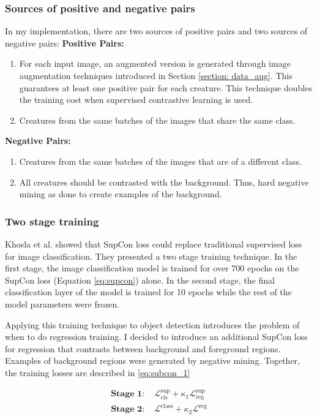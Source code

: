 \documentclass[12pt,a4paper,twoside,openany]{report}
\newcommand{\suploss}{\mathcal{L}^\text{sup}}
\newcommand{\clsloss}{\mathcal{L}^\text{class}}
\newcommand{\regloss}{\mathcal{L}^\text{reg}}
\begin{document}
\subsubsection{Sources of positive and negative pairs} \label{section:scl_double}
In my implementation, there are two sources of positive pairs and two sources of negative pairs:
\textbf{Positive Pairs:}
\begin{enumerate}
    \item For each input image, an augmented version is generated through image augmentation techniques introduced in Section \ref{section: data_aug}. This guarantees at least one positive pair for each creature. This technique doubles the training cost when supervised contrastive learning is used.
    \item Creatures from the same batches of the images that share the same class.
\end{enumerate}

\textbf{Negative Pairs:}
\begin{enumerate}
    \item Creatures from the same batches of the images that are of a different class.
    \item All creatures should be contrasted with the background. Thus, hard negative mining as done to create examples of the background.
\end{enumerate}

\subsubsection{Two stage training}
Khosla et al. \cite{khosla_supervised_2021} showed that SupCon loss could replace traditional supervised loss for image classification. They presented a two stage training technique. In the first stage, the image classification model is trained for over 700 epochs on the SupCon loss (Equation \ref{eq:supcon}) alone. In the second stage, the final classification layer of the model is trained for 10 epochs while the rest of the model parameters were frozen. 

Applying this training technique to object detection introduces the problem of when to do regression training. I decided to introduce an additional SupCon loss for regression that contrasts between background and foreground regions. Examples of background regions were generated by negative mining. Together, the training losses are described in \ref{eq:subcon_1}


\begin{align*} \label{eq:subcon_1}
    \textbf{Stage 1: }& \suploss_\text{cls} + \kappa_1\suploss_\text{reg}\\
    \textbf{Stage 2: }& \clsloss + \kappa_2 \regloss
\end{align*}
\end{document}
